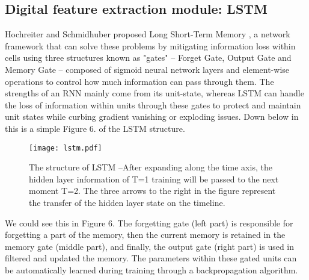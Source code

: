 \documentclass{ecai}
\begin{document}
\subsection{Digital feature extraction module: LSTM}






Hochreiter and Schmidhuber proposed Long Short-Term Memory \cite{hochreiter_long_1997}, a network framework that can solve these problems by mitigating information loss within cells using three structures known as "gates" -- Forget Gate, Output Gate and Memory Gate -- composed of sigmoid neural network layers and element-wise operations to control how much information can pass through them. The strengths of an RNN mainly come from its unit-state, whereas LSTM can handle the loss of information within units through these gates to protect and maintain unit states while curbing gradient vanishing or exploding issues. Down below in this is a simple Figure 6. of the LSTM structure.

\begin{figure}[htp]
    \centering
    \texttt{[image: lstm.pdf]}
     \caption{The structure of LSTM --After expanding along the time axis, the hidden layer information of T=1 training will be passed to the next moment T=2. The three arrows to the right in the figure represent the transfer of the hidden layer state on the timeline.}
    \label{fig:network}
\end{figure}



We could see this in Figure 6. The forgetting gate (left part) is responsible for forgetting a part of the memory, then the current memory is retained in the memory gate (middle part), and finally, the output gate (right part) is used in filtered and updated the memory. The parameters within these gated units can be automatically learned during training through a backpropagation algorithm.
\end{document}
